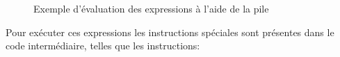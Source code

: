 \documentclass[12pt]{scrartcl}
\begin{document}
\begin{figure}[h]
  \centering
  \caption{Exemple d'évaluation des expressions à l'aide de la pile}
  \centering
  \label{fig:pile}
\end{figure}

\newpage 
Pour exécuter ces expressions les instructions spéciales sont présentes dans le code intermédiaire, 
telles que les instructions:
\end{document}
